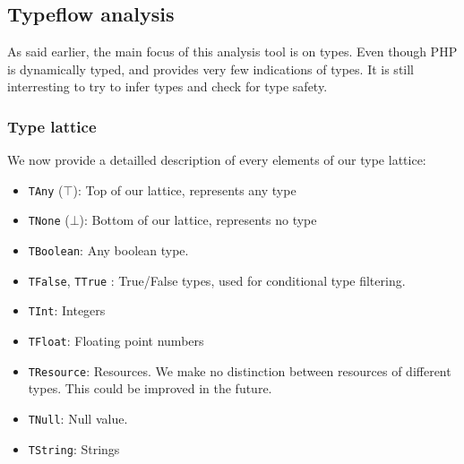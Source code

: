 \documentclass[a4paper]{article}
\begin{document}
\subsection{Typeflow analysis}
As said earlier, the main focus of this analysis tool is on types. Even though
PHP is dynamically typed, and provides very few indications of types. It is
still interresting to try to infer types and check for type safety.

\subsubsection{Type lattice}
We now provide a detailled description of every elements of our type lattice:
\begin{itemize}
  \item \verb=TAny= ($\top$): Top of our lattice, represents any type
  \item \verb=TNone= ($\bot$): Bottom of our lattice, represents no type
  \item \verb=TBoolean=: Any boolean type.
  \item \verb=TFalse=, \verb=TTrue= : True/False types, used for conditional
    type filtering.
  \item \verb=TInt=: Integers
  \item \verb=TFloat=: Floating point numbers
  \item \verb=TResource=: Resources. We make no distinction between resources
    of different types. This could be improved in the future.
  \item \verb=TNull=: Null value.
  \item \verb=TString=: Strings
\end{itemize}
\end{document}
